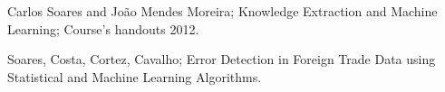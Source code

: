\documentclass[12pt]{article}
\begin{document}
\begin{thebibliography}{9}

Carlos Soares and João Mendes Moreira; Knowledge Extraction and Machine Learning; Course’s handouts 2012.

Soares, Costa, Cortez, Cavalho; Error Detection in Foreign Trade Data   using Statistical and Machine Learning Algorithms.

\end{thebibliography}
\end{document}
